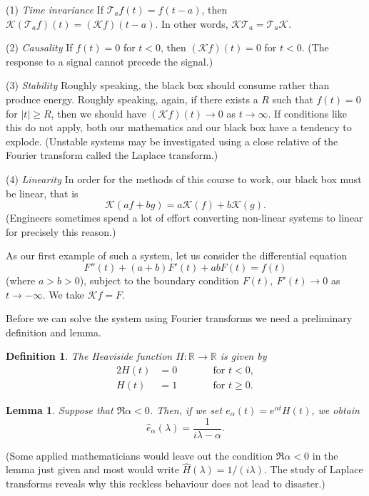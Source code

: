 \documentclass[12pt]{article}
\newtheorem{lemma}[theorem]{Lemma}
\newtheorem{definition}[theorem]{Definition}
\theoremstyle{definition}
\begin{document}
(1) \emph{Time invariance} If ${\mathcal T}_{a}f(t)=f(t-a)$,
then ${\mathcal K}({\mathcal T}_{a}f)(t)=({\mathcal K}f)(t-a)$.
In other words, ${\mathcal K}{\mathcal T}_{a}
={\mathcal T}_{a}{\mathcal K}$.

(2) \emph{Causality} If $f(t)=0$ for $t<0$, then
$({\mathcal K}f)(t)=0$ for $t<0$. (The response
to a signal cannot precede the signal.)

(3) \emph{Stability} Roughly speaking, the black box
should consume rather than produce energy. Roughly
speaking, again, if there exists a $R$ such that
$f(t)=0$ for $|t|\geq R$, then we should have
$({\mathcal K}f)(t)\rightarrow 0$ as $t\rightarrow\infty$.
If conditions like this do not apply, both our mathematics
and our black box have a tendency to explode. 
(Unstable systems may be investigated using a close
relative of the Fourier transform called the Laplace transform.)

(4) \emph{Linearity} In order for the methods of this course
to work, our black box must be linear, that is
\[{\mathcal K}(af+bg)=a{\mathcal K}(f)+b{\mathcal K}(g).\]
(Engineers sometimes spend a lot of effort converting
non-linear systems to linear for precisely this reason.)

As our first example of such a system, let us consider
the differential equation
\begin{equation*}
\tag*{$\bigstar$}
F''(t)+(a+b)F'(t)+ab F(t)=f(t)
\end{equation*}
(where $a>b>0$), subject to the boundary condition
$F(t),\ F'(t)\rightarrow 0$ as $t\rightarrow -\infty$. 
We take ${\mathcal K}f=F$.

Before we can solve the system using Fourier transforms
we need a preliminary definition and lemma.
\begin{definition} The Heaviside function
$H:{\mathbb R}\rightarrow{\mathbb R}$ is given by
\begin{alignat*}{2}
H(t)&=0&&\qquad\text{for $t<0$},\\
H(t)&=1&&\qquad\text{for $t\geq 0$.}
\end{alignat*}
\end{definition}
\begin{lemma} Suppose that $\Re \alpha<0$. Then, if we set
$e_{\alpha}(t)=e^{\alpha t}H(t)$, we obtain
\[\hat{e}_{\alpha}(\lambda)=\frac{1}{i\lambda-\alpha}.\]
\end{lemma}
(Some applied mathematicians would leave out
the condition $\Re \alpha<0$ in the lemma
just given and most would write $\hat{H}(\lambda)=1/(i\lambda)$.
The study of Laplace transforms reveals why this reckless
behaviour does not lead to disaster.)
\end{document}
